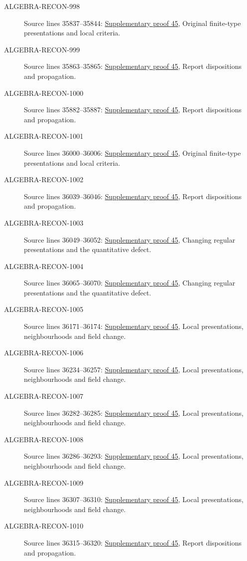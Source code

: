 \begin{description}
\item[ALGEBRA-RECON-998] Source lines 35837--35844: \hyperlink{algebra_lci_notes_20260928}{Supplementary proof 45}, Original finite-type presentations and local criteria.
\item[ALGEBRA-RECON-999] Source lines 35863--35865: \hyperlink{algebra_lci_notes_20260928}{Supplementary proof 45}, Report dispositions and propagation.
\item[ALGEBRA-RECON-1000] Source lines 35882--35887: \hyperlink{algebra_lci_notes_20260928}{Supplementary proof 45}, Report dispositions and propagation.
\item[ALGEBRA-RECON-1001] Source lines 36000--36006: \hyperlink{algebra_lci_notes_20260928}{Supplementary proof 45}, Original finite-type presentations and local criteria.
\item[ALGEBRA-RECON-1002] Source lines 36039--36046: \hyperlink{algebra_lci_notes_20260928}{Supplementary proof 45}, Report dispositions and propagation.
\item[ALGEBRA-RECON-1003] Source lines 36049--36052: \hyperlink{algebra_lci_notes_20260928}{Supplementary proof 45}, Changing regular presentations and the quantitative defect.
\item[ALGEBRA-RECON-1004] Source lines 36065--36070: \hyperlink{algebra_lci_notes_20260928}{Supplementary proof 45}, Changing regular presentations and the quantitative defect.
\item[ALGEBRA-RECON-1005] Source lines 36171--36174: \hyperlink{algebra_lci_notes_20260928}{Supplementary proof 45}, Local presentations, neighbourhoods and field change.
\item[ALGEBRA-RECON-1006] Source lines 36234--36257: \hyperlink{algebra_lci_notes_20260928}{Supplementary proof 45}, Local presentations, neighbourhoods and field change.
\item[ALGEBRA-RECON-1007] Source lines 36282--36285: \hyperlink{algebra_lci_notes_20260928}{Supplementary proof 45}, Local presentations, neighbourhoods and field change.
\item[ALGEBRA-RECON-1008] Source lines 36286--36293: \hyperlink{algebra_lci_notes_20260928}{Supplementary proof 45}, Local presentations, neighbourhoods and field change.
\item[ALGEBRA-RECON-1009] Source lines 36307--36310: \hyperlink{algebra_lci_notes_20260928}{Supplementary proof 45}, Local presentations, neighbourhoods and field change.
\item[ALGEBRA-RECON-1010] Source lines 36315--36320: \hyperlink{algebra_lci_notes_20260928}{Supplementary proof 45}, Report dispositions and propagation.

\end{description}
